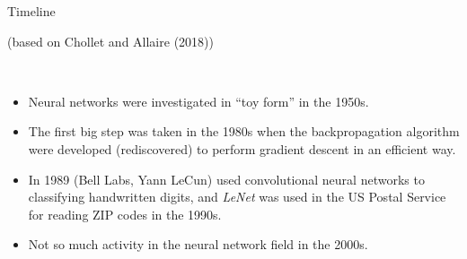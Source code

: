 \documentclass[10pt,ignorenonframetext,]{beamer}
\providecommand{\tightlist}{%
  \setlength{\itemsep}{0pt}\setlength{\parskip}{0pt}}
\begin{document}
\begin{frame}

\begin{block}{Timeline}

(based on Chollet and Allaire (2018))

\(~\)

\begin{itemize}
\tightlist
\item
  Neural networks were investigated in ``toy form'' in the 1950s.
\end{itemize}

\vspace{2mm}

\begin{itemize}
\tightlist
\item
  The first big step was taken in the 1980s when the backpropagation
  algorithm were developed (rediscovered) to perform gradient descent in
  an efficient way.
\end{itemize}

\vspace{2mm}

\begin{itemize}
\tightlist
\item
  In 1989 (Bell Labs, Yann LeCun) used convolutional neural networks to
  classifying handwritten digits, and \emph{LeNet} was used in the US
  Postal Service for reading ZIP codes in the 1990s.
\end{itemize}

\vspace{2mm}

\begin{itemize}
\tightlist
\item
  Not so much activity in the neural network field in the 2000s.
\end{itemize}

\end{block}

\end{frame}
\end{document}
